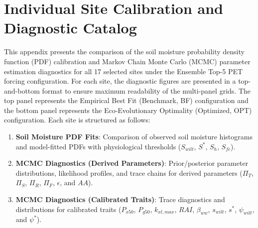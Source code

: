 \documentclass[11pt,a4paper]{article}
\begin{document}
\section{Individual Site Calibration and Diagnostic Catalog}
This appendix presents the comparison of the soil moisture probability density function (PDF) calibration and Markov Chain Monte Carlo (MCMC) parameter estimation diagnostics for all 17 selected sites under the Ensemble Top-5 PET forcing configuration. For each site, the diagnostic figures are presented in a top-and-bottom format to ensure maximum readability of the multi-panel grids. The top panel represents the Empirical Best Fit (Benchmark, BF) configuration and the bottom panel represents the Eco-Evolutionary Optimality (Optimized, OPT) configuration. Each site is structured as follows:
\begin{enumerate}
  \item \textbf{Soil Moisture PDF Fits}: Comparison of observed soil moisture histograms and model-fitted PDFs with physiological thresholds ($S_{wilt}$, $S^*$, $S_h$, $S_{fc}$).
  \item \textbf{MCMC Diagnostics (Derived Parameters)}: Prior/posterior parameter distributions, likelihood profiles, and trace chains for derived parameters ($\Pi_T$, $\Pi_S$, $\Pi_R$, $\Pi_F$, $\epsilon$, and $AA$).
  \item \textbf{MCMC Diagnostics (Calibrated Traits)}: Trace diagnostics and distributions for calibrated traits ($P_{x50}$, $P_{g50}$, $k_{xl,max}$, $RAI$, $\beta_{ww}$, $s_{wilt}$, $s^*$, $\psi_{wilt}$, and $\psi^*$).
\end{enumerate}
\newpage
\end{document}
